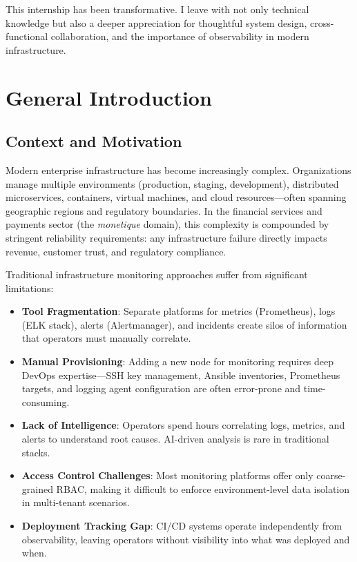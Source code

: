 \documentclass[12pt,a4paper]{report}
\begin{document}
This internship has been transformative. I leave with not only technical knowledge but also a deeper appreciation for thoughtful system design, cross-functional collaboration, and the importance of observability in modern infrastructure.

\newpage

\tableofcontents
\newpage

\chapter*{General Introduction}

\section*{Context and Motivation}

Modern enterprise infrastructure has become increasingly complex. Organizations manage multiple environments (production, staging, development), distributed microservices, containers, virtual machines, and cloud resources—often spanning geographic regions and regulatory boundaries. In the financial services and payments sector (the \textit{monetique} domain), this complexity is compounded by stringent reliability requirements: any infrastructure failure directly impacts revenue, customer trust, and regulatory compliance.

Traditional infrastructure monitoring approaches suffer from significant limitations:

\begin{itemize}
  \item \textbf{Tool Fragmentation}: Separate platforms for metrics (Prometheus), logs (ELK stack), alerts (Alertmanager), and incidents create silos of information that operators must manually correlate.
  \item \textbf{Manual Provisioning}: Adding a new node for monitoring requires deep DevOps expertise—SSH key management, Ansible inventories, Prometheus targets, and logging agent configuration are often error-prone and time-consuming.
  \item \textbf{Lack of Intelligence}: Operators spend hours correlating logs, metrics, and alerts to understand root causes. AI-driven analysis is rare in traditional stacks.
  \item \textbf{Access Control Challenges}: Most monitoring platforms offer only coarse-grained RBAC, making it difficult to enforce environment-level data isolation in multi-tenant scenarios.
  \item \textbf{Deployment Tracking Gap}: CI/CD systems operate independently from observability, leaving operators without visibility into what was deployed and when.
\end{itemize}
\end{document}

